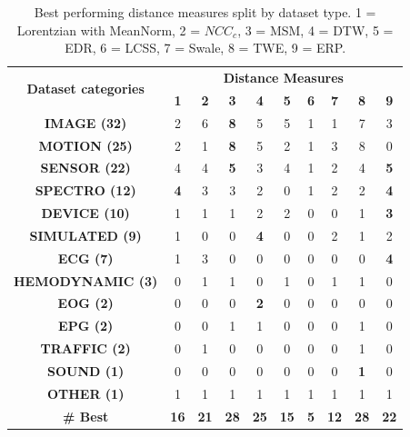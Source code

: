 \begin{table}[]
\footnotesize
\centering
\begin{tabular}{|c|c|c|c|c|c|c|c|c|c|}
\hline
\multirow{2}{*}{\textbf{Dataset categories}} & \multicolumn{9}{c|}{\textbf{Distance Measures}} \\ \cline{2-10} 
 & \textbf{1} & \textbf{2} & \textbf{3} & \textbf{4} & \textbf{5} & \textbf{6} & \textbf{7} & \textbf{8} & \textbf{9} \\ \hline \hline
\textbf{IMAGE (32)} & 2 & 6 & \textbf{8} & 5 & 5 & 1 & 1 & 7 & 3 \\ \hline
\textbf{MOTION (25)} & 2 & 1 & \textbf{8} & 5 & 2 & 1 & 3 & 8 & 0 \\ \hline
\textbf{SENSOR (22)} & 4 & 4 & \textbf{5} & 3 & 4 & 1 & 2 & 4 & \textbf{5} \\ \hline
\textbf{SPECTRO (12)} & \textbf{4} & 3 & 3 & 2 & 0 & 1 & 2 & 2 & \textbf{4} \\ \hline
\textbf{DEVICE (10)} & 1 & 1 & 1 & 2 & 2 & 0 & 0 & 1 & \textbf{3} \\ \hline
\textbf{SIMULATED (9)} & 1 & 0 & 0 & \textbf{4} & 0 & 0 & 2 & 1 & 2 \\ \hline
\textbf{ECG (7)} & 1 & 3 & 0 & 0 & 0 & 0 & 0 & 0 & \textbf{4} \\ \hline
\textbf{HEMODYNAMIC (3)} & 0 & 1 & 1 & 0 & 1 & 0 & 1 & 1 & 0 \\ \hline
\textbf{EOG (2)} & 0 & 0 & 0 & \textbf{2} & 0 & 0 & 0 & 0 & 0 \\ \hline
\textbf{EPG (2)} & 0 & 0 & 1 & 1 & 0 & 0 & 0 & 1 & 0 \\ \hline
\textbf{TRAFFIC (2)} & 0 & 1 & 0 & 0 & 0 & 0 & 0 & 1 & 0 \\ \hline
\textbf{SOUND (1)} & 0 & 0 & 0 & 0 & 0 & 0 & 0 & \textbf{1} & 0 \\ \hline
\textbf{OTHER (1)} & 1 & 1 & 1 & 1 & 1 & 1 & 1 & 1 & 1 \\ \hline \hline
\textbf{\# Best} & \textbf{16} & \textbf{21} & \textbf{28} & \textbf{25} & \textbf{15} & \textbf{5} & \textbf{12} & \textbf{28} & \textbf{22} \\ \hline 
\end{tabular}%
\caption{Best performing distance measures split by dataset type. 1 = Lorentzian with MeanNorm, 2 = $NCC_c$, 3 = MSM, 4 = DTW, 5 = EDR, 6 = LCSS, 7 = Swale, 8 = TWE, 9 = ERP.}
\label{tab:overall_ranking}
\end{table}